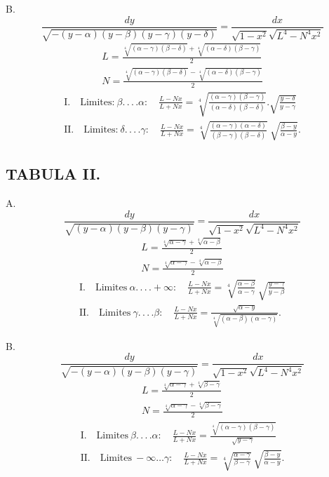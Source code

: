 \documentclass{article}
\begin{document}
B.
\[
\frac{dy}{\sqrt{-(y-\alpha)(y-\beta)(y-\gamma)(y-\delta)}}=\frac{dx}{\sqrt{1-x^{2}}\sqrt{L^{4}-N^{4}x^{2}}}
\]
\[
\begin{gathered}
L=\frac{\sqrt[4]{(\alpha-\gamma)(\beta-\delta)}+\sqrt[4]{(\alpha-\delta)(\beta-\gamma)}}{2}\\
N=\frac{\sqrt[4]{(\alpha-\gamma)(\beta-\delta)}-\sqrt[4]{(\alpha-\delta)(\beta-\gamma)}}{2}
\end{gathered}
\]
\[
\begin{gathered}
\text{I.}\quad\text{Limites:}\ \beta.\,.\,.\,.\alpha:\quad\frac{L-Nx}{L+Nx}=\sqrt[4]{\frac{(\alpha-\gamma)(\beta-\gamma)}{(\alpha-\delta)(\beta-\delta)}}.\sqrt{\frac{y-\delta}{y-\gamma}}\\
\text{II.}\quad\text{Limites:}\ \delta.\,.\,.\,.\gamma:\quad\frac{L-Nx}{L+Nx}=\sqrt[4]{\frac{(\alpha-\gamma)(\alpha-\delta)}{(\beta-\gamma)(\beta-\delta)}}\ \sqrt{\frac{\beta-y}{\alpha-y}}.
\end{gathered}
\]


\subsection*{TABULA II.}

A.
\[
\frac{dy}{\sqrt{(y-\alpha)(y-\beta)(y-\gamma)}}=\frac{dx}{\sqrt{1-x^{2}}\sqrt{L^{4}-N^{4}x^{2}}}
\]
\[
\begin{gathered}
L=\frac{\sqrt[4]{\alpha-\gamma}+\sqrt[4]{\alpha-\beta}}{2}\\
N=\frac{\sqrt[4]{\alpha-\gamma}-\sqrt[4]{\alpha-\beta}}{2}
\end{gathered}
\]
\[
\begin{gathered}
\text{I.}\quad\text{Limites}\ \alpha.\,.\,.\,.+\infty:\quad\frac{L-Nx}{L+Nx}=\sqrt[4]{\frac{\alpha-\beta}{\alpha-\gamma}}\ \sqrt{\frac{y-\gamma}{y-\beta}}\\
\text{II.}\quad\text{Limites}\ \gamma.\,.\,.\,.\beta:\quad\frac{L-Nx}{L+Nx}=\frac{\sqrt{\alpha-y}}{\sqrt[4]{(\alpha-\beta)(\alpha-\gamma)}}.
\end{gathered}
\]

B.
\[
\frac{dy}{\sqrt{-(y-\alpha)(y-\beta)(y-\gamma)}}=\frac{dx}{\sqrt{1-x^{2}}\sqrt{L^{4}-N^{4}x^{2}}}
\]
\[
\begin{gathered}
L=\frac{\sqrt[4]{\alpha-\gamma}+\sqrt[4]{\beta-\gamma}}{2}\\
N=\frac{\sqrt[4]{\alpha-\gamma}-\sqrt[4]{\beta-\gamma}}{2}
\end{gathered}
\]
\[
\begin{gathered}
\text{I.}\quad\text{Limites}\ \beta.\,.\,.\,.\alpha:\quad\frac{L-Nx}{L+Nx}=\frac{\sqrt[4]{(\alpha-\gamma)(\beta-\gamma)}}{\sqrt{y-\gamma}}\\
\text{II.}\quad\text{Limites}\ -\infty\ldots\gamma:\quad\frac{L-Nx}{L+Nx}=\sqrt[4]{\frac{\alpha-\gamma}{\beta-\gamma}}\ \sqrt{\frac{\beta-y}{\alpha-y}}.
\end{gathered}
\]
\end{document}
